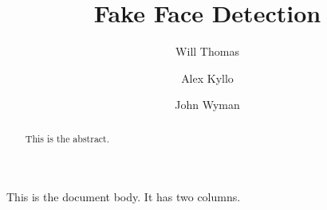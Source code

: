 \documentclass[12pt, letterpaper]{article}
\title{Fake Face Detection}
\author{
  Will Thomas
  \and
  Alex Kyllo
  \and
  John Wyman
}
\begin{document}
\maketitle

\begin{abstract}
  This is the abstract.
\end{abstract}

\begin{multicols}{2}
  This is the document body. It has two columns.
\end{multicols}
\end{document}
